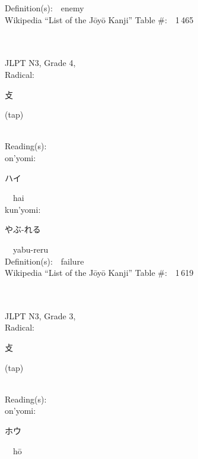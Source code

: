 \begin{multicols}{2}
Definition(s):\ \ enemy \\
Wikipedia ``List of the J\=oy\=o Kanji'' Table \#:\ \ 1\,465 \\
\ \ \\
{\fontsize{34pt}{40pt}  }\ \ \\  %
{JLPT N3, Grade 4, \\Radical:\ \ {\begin{CJK}{UTF8}{min} 攴 \end{CJK}} (tap) } \\
Reading(s):\ \ \\
{\hspace*{1em}}on'yomi:\ \ \\
{\hspace*{2em}}{\begin{CJK}{UTF8}{min} ハイ \end{CJK}}\ \ hai\ \ \\
{\hspace*{1em}}kun'yomi:\ \ \\
{\hspace*{2em}}{\begin{CJK}{UTF8}{min} やぶ-れる \end{CJK}}\ \ yabu-reru\ \ \\
Definition(s):\ \ failure \\
Wikipedia ``List of the J\=oy\=o Kanji'' Table \#:\ \ 1\,619 \\
\ \ \\
{\fontsize{34pt}{40pt}  }\ \ \\  %
{JLPT N3, Grade 3, \\Radical:\ \ {\begin{CJK}{UTF8}{min} 攴 \end{CJK}} (tap) } \\
Reading(s):\ \ \\
{\hspace*{1em}}on'yomi:\ \ \\
{\hspace*{2em}}{\begin{CJK}{UTF8}{min} ホウ \end{CJK}}\ \ h\=o\ \ \\

\end{multicols}

